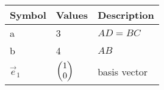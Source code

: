 \begin{tabular}{|p{3cm}|p{3cm}|p{3cm}|}
\hline                                        
	\textbf{Symbol} & \textbf{Values} & \textbf{Description} \\                                          
\hline                                 
	a & 3 & $AD=BC$ \\        
\hline                                    
	b & 4 & $AB$ \\    
\hline                      
	$\vec{e}_1$ & $\begin{pmatrix}1\\0\end{pmatrix}$ & basis vector \\
\hline
\end{tabular}
